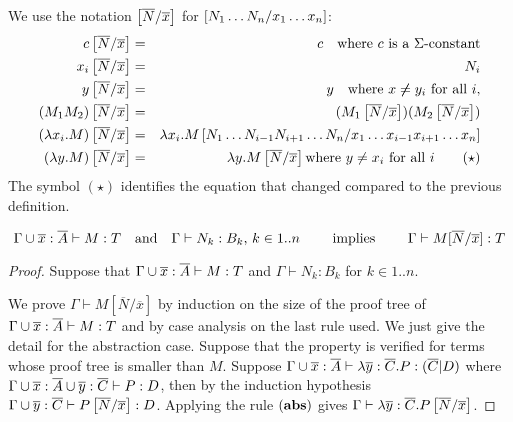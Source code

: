 \begin{dfn}
 We use the notation
$\left[ \overline{N}/\overline{x} \right]$ for $\left[ N_1 \ldots N_n/x_1
\ldots x_n \right]$:
\begin{eqnarray*}
c \left[ \overline{N}/\overline{x} \right] &=& c \quad \mbox{where $c$ is a $\Sigma$-constant}\\
 x_i \left[ \overline{N}/\overline{x} \right] &=& N_i\\
 y \left[ \overline{N}/\overline{x} \right] &=& y \quad \mbox{where } x \not \neq y_i \mbox{ for all } i,\\
(M_1 M_2) \left[ \overline{N}/\overline{x} \right] &=& (M_1 \left[ \overline{N}/\overline{x} \right]) (M_2 \left[ \overline{N}/\overline{x} \right])\\
(\lambda x_i . M) \left[ \overline{N}/\overline{x} \right] &=& \lambda x_i
. M
\left[ N_1 \ldots N_{i-1} N_{i+1}\ldots N_n/x_1 \ldots x_{i-1} x_{i+1}\ldots x_n \right] \\
(\lambda y . M) \left[ \overline{N}/\overline{x} \right] &=& \lambda y . M
\left[ \overline{N}/\overline{x} \right] \mbox{where $y \not = x_i$ for
all $i$} \qquad \mathbf{(\star)}
\end{eqnarray*}
The symbol $\mathbf{(\star)}$ identifies the equation that changed
compared to the previous definition.
\end{dfn}

\begin{lem}
\label{lem:subst_preserve_i}
$$ \Gamma\cup \overline{x} : \overline{A}\vdash M : T
\quad \mbox{and} \quad \Gamma \vdash N_k : B_k \mbox{, } k \in
1..n \qquad \mbox{ implies } \qquad \Gamma \vdash
M[\overline{N}/\overline{x}] : T$$
\end{lem}

\begin{proof}
Suppose that $\Gamma \cup \overline{x}: \overline{A} \vdash M :T$ and
$\Gamma \vdash N_k : B_k$ for $k \in 1..n$.

We prove $\Gamma \vdash M[\overline{N}/\overline{x}]$ by induction
on the size of the proof tree of $\Gamma\cup \overline{x}:\overline{A}
\vdash M : T$ and by case analysis on the last rule used. We just
give the detail for the abstraction case. Suppose that the property
is verified for terms whose proof tree is smaller than $M$. Suppose
$\Gamma \cup \overline{x}:\overline{A} \vdash \lambda \overline{y} :
\overline{C}. P : (\overline{C}|D)$ where $\Gamma\cup
\overline{x}:\overline{A}\cup \overline{y}:\overline{C} \vdash P :
D$, then by the induction hypothesis $\Gamma\cup
\overline{y}:\overline{C} \vdash
P\left[ \overline{N}/\overline{x} \right] : D$. Applying the rule
$\mathbf{(abs)}$ gives $\Gamma \vdash \lambda
\overline{y}:\overline{C} . P \left[ \overline{N}/\overline{x} \right]$.
\end{proof}

